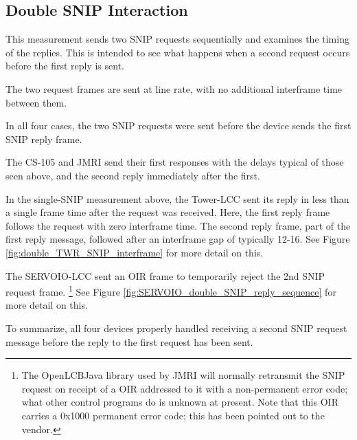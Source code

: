 \documentclass[11pt]{article}
\begin{document}
\clearpage



\subsection{Double SNIP Interaction}

This measurement sends two SNIP requests sequentially and examines the timing of the replies.
This is intended to see what happens when a second request occurs before the first reply is sent.

The two request frames are sent at line rate, with no additional interframe time
between them.

In all four cases, the two SNIP requests were sent before the device sends the first 
SNIP reply frame.

The CS-105 and JMRI send their first responses with the delays typical of those seen 
above, and the second reply immediately after the first. 

In the single-SNIP measurement above, the Tower-LCC sent its reply in less than a single frame time
after the request was received.  
Here, the first reply frame follows the request with zero interframe time. 
The second reply frame, part of the first reply message, followed after
an interframe gap of typically 12-16\us.
See Figure \ref{fig:double_TWR_SNIP_interframe} for more detail on this.

The SERVOIO-LCC sent an OIR frame to temporarily reject the 2nd SNIP request
frame.
\footnote{The OpenLCB\textunderscore  Java library used by JMRI will 
    normally retransmit the SNIP request on receipt
    of a OIR addressed to it with a non-permanent error code; 
    what other control programs do is unknown at present.
    Note that this OIR carries a 0x1000 permanent error code;
    this has been pointed out to the vendor.
}
See Figure \ref{fig:SERVOIO_double_SNIP_reply_sequence} for more detail on this.

To summarize, all four devices properly handled receiving a second SNIP request
message before the reply to the first request has been sent.
\end{document}
